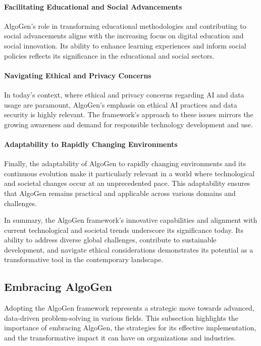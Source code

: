 \documentclass{article}
\begin{document}
\paragraph{Facilitating Educational and Social Advancements}
AlgoGen’s role in transforming educational methodologies and contributing to social advancements aligns with the increasing focus on digital education and social innovation. Its ability to enhance learning experiences and inform social policies reflects its significance in the educational and social sectors.

\paragraph{Navigating Ethical and Privacy Concerns}
In today's context, where ethical and privacy concerns regarding AI and data usage are paramount, AlgoGen's emphasis on ethical AI practices and data security is highly relevant. The framework’s approach to these issues mirrors the growing awareness and demand for responsible technology development and use.

\paragraph{Adaptability to Rapidly Changing Environments}
Finally, the adaptability of AlgoGen to rapidly changing environments and its continuous evolution make it particularly relevant in a world where technological and societal changes occur at an unprecedented pace. This adaptability ensures that AlgoGen remains practical and applicable across various domains and challenges.

In summary, the AlgoGen framework’s innovative capabilities and alignment with current technological and societal trends underscore its significance today. Its ability to address diverse global challenges, contribute to sustainable development, and navigate ethical considerations demonstrates its potential as a transformative tool in the contemporary landscape.



\subsection{Embracing AlgoGen}
Adopting the AlgoGen framework represents a strategic move towards advanced, data-driven problem-solving in various fields. This subsection highlights the importance of embracing AlgoGen, the strategies for its effective implementation, and the transformative impact it can have on organizations and industries.
\end{document}
